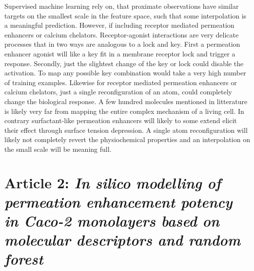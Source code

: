 Supervised machine learning rely on, that proximate observations have similar targets on the smallest scale in the feature space, such that some interpolation is a meaningful prediction. However, if including receptor mediated permeation enhancers or calcium chelators. Receptor-agonist interactions are very delicate processes that in two ways are analogous to a lock and key. First a permeation enhancer agonist will like a key fit in a membrane receptor lock and trigger a response. Secondly, just the slightest change of the key or lock could disable the activation. To map any possible key combination would take a very high number of training examples. Likewise for receptor mediated permeation enhancers or calcium chelators, just a single reconfiguration of an atom, could completely change the biological response. A few hundred molecules mentioned in litterature is likely very far from mapping the entire complex mechanism of a living cell. In contrary surfactant-like permeation enhancers will likely to some extend elicit their effect through surface tension depression. A single atom reconfiguration will likely not completely revert the physiochemical properties and an interpolation on the small scale will be meaning full.

\section{Article 2: \textit{In silico modelling of permeation enhancement potency in Caco-2 monolayers based on molecular descriptors and random forest}}
\label{article:predAbs}

\newpage



